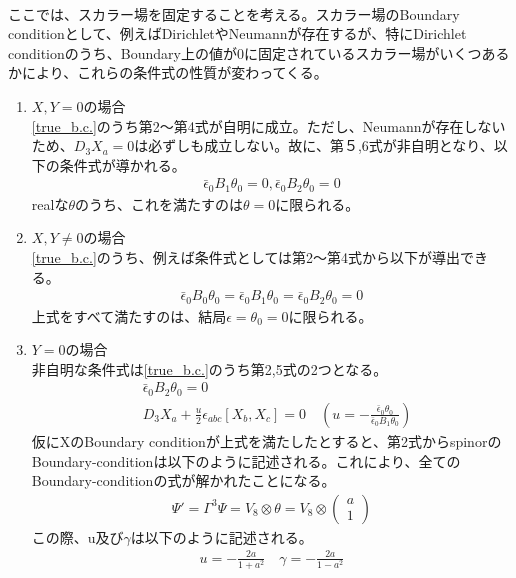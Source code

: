 \documentclass[dvipdfmx,a4paper,10.5pt]{article}
\numberwithin{equation}{section}
\begin{document}
\\
ここでは、スカラー場を固定することを考える。スカラー場のBoundary conditionとして、例えばDirichletやNeumannが存在するが、特にDirichlet conditionのうち、Boundary上の値が0に固定されているスカラー場がいくつあるかにより、これらの条件式の性質が変わってくる。
\begin{enumerate}
    \item $X,Y=0$の場合\\
    \eqref{true_b.c.}のうち第2～第4式が自明に成立。ただし、Neumannが存在しないため、$D_{3}X_{a}=0$は必ずしも成立しない。故に、第５,6式が非自明となり、以下の条件式が導かれる。
    \begin{equation}\begin{split}
        \bar{\epsilon}_{0}B_{1}\theta_{0}=0,\bar{\epsilon}_{0}B_{2}\theta_{0}=0
    \end{split} \end{equation}
    realな$\theta$のうち、これを満たすのは$\theta=0$に限られる。
    \item $X,Y\neq 0$の場合\\
    \eqref{true_b.c.}のうち、例えば条件式としては第2～第4式から以下が導出できる。
    \begin{equation}\begin{split}
    \bar{\epsilon}_{0}B_{0}\theta_{0}=\bar{\epsilon}_{0}B_{1}\theta_{0}=\bar{\epsilon}_{0}B_{2}\theta_{0}=0
    \end{split} \end{equation}
    上式をすべて満たすのは、結局$\epsilon=\theta_{0}=0$に限られる。\\
    \item $Y=0$の場合\\
    非自明な条件式は\eqref{true_b.c.}のうち第2,5式の2つとなる。
    \begin{equation}\begin{split}
    &\bar{\epsilon}_{0}B_{2}\theta_{0}=0\\
        &D_{3}X_{a}+\frac{u}{2}\epsilon_{abc}[X_{b},X_{c}]=0 \quad(u=-\frac{\bar{\epsilon}_{0}\theta_{0}}{\bar{\epsilon}_{0}B_{1}\theta_{0}})
    \end{split} \end{equation}   
    仮にXのBoundary conditionが上式を満たしたとすると、第2式からspinorのBoundary-conditionは以下のように記述される。これにより、全てのBoundary-conditionの式が解かれたことになる。
    \begin{equation}\begin{split}
        \Psi'=\Gamma^{3}\Psi=V_{8}\otimes \theta= V_{8}\otimes\begin{pmatrix}
       a \\ 1
        \end{pmatrix}
    \end{split} \end{equation}
    この際、u及び$\gamma$は以下のように記述される。
    \begin{equation}\begin{split}
        u=-\frac{2a}{1+a^{2}} \quad \gamma=-\frac{2a}{1-a^{2}}
    \end{split} \end{equation}
    \end{enumerate}
\end{document}
